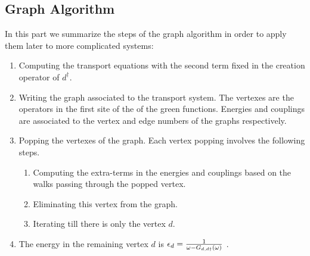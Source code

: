 


\subsection{Graph Algorithm \label{sec:Algorithm}}

In this part we summarize the steps of the graph algorithm in order to apply them later to more complicated systems:
\begin{enumerate}
    \item Computing the transport equations with the second term fixed in the creation operator of  $d^\dagger$.
     \item  Writing the  graph associated to the transport system. The vertexes are the operators in the first site of the of the green functions. Energies and couplings are associated to the vertex and edge numbers of the graphs respectively.  
    \item Popping the vertexes of the graph. Each vertex popping involves the following steps.
    \begin{enumerate}
        \item Computing the extra-terms in the energies and couplings based on the walks passing through the popped vertex.
        \item Eliminating this vertex from the graph. 
        \item Iterating till there is only the vertex $d$.
        \end{enumerate}
    \item The energy in the remaining vertex $d$ is $\epsilon_d = \frac{1}{\omega -G_{d,d\dagger}(\omega)}$ .
\end{enumerate}


